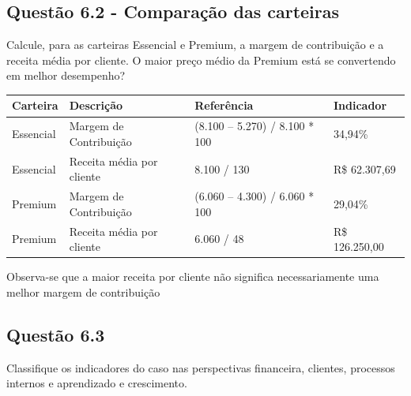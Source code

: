 \subsection{Questão 6.2 - Comparação das carteiras}
Calcule, para as carteiras Essencial e Premium, a margem de contribuição e a receita média por cliente. O maior preço médio da Premium está se convertendo em melhor desempenho?\\
 \begin{tabular}{p{2cm} l l l}                                                     
 \toprule                                                                       
 \textbf{Carteira} & \textbf{Descrição} & \textbf{Referência} & \textbf{Indicador} \\
 \midrule
 Essencial & Margem de Contribuição & (8.100 – 5.270) / 8.100 * 100  & 34,94\% \\
 \midrule                                                                       
 Essencial & Receita média por cliente  & 8.100 / 130  & R\$ 62.307,69  \\                                        
 \midrule                                                                       
 Premium &  Margem de Contribuição & (6.060 – 4.300) / 6.060 * 100  & 29,04\% \\
 \midrule                                                                       
 Premium &  Receita média por cliente  & 6.060 / 48 & R\$ 126.250,00  \\ 
 \bottomrule                                                                    
 \end{tabular}
 Observa-se que a maior receita por cliente não significa necessariamente uma melhor margem de contribuição\\
\subsection{Questão 6.3}
Classifique os indicadores do caso nas perspectivas financeira, clientes, processos internos e aprendizado e crescimento.
